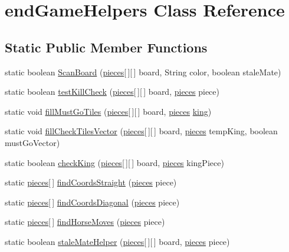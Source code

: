 \hypertarget{classendGameHelpers}{\section{end\-Game\-Helpers Class Reference}
\label{classendGameHelpers}
}
\subsection*{Static Public Member Functions}
\begin{DoxyCompactItemize}
\item 
static boolean \hyperlink{classendGameHelpers_af70c6992d6a206eb89390d43bb94127e}{Scan\-Board} (\hyperlink{classpieces}{pieces}\mbox{[}$\,$\mbox{]}\mbox{[}$\,$\mbox{]} board, String color, boolean stale\-Mate)
\item 
static boolean \hyperlink{classendGameHelpers_ad647747d8db844a580cf5d390cf5c257}{test\-Kill\-Check} (\hyperlink{classpieces}{pieces}\mbox{[}$\,$\mbox{]}\mbox{[}$\,$\mbox{]} board, \hyperlink{classpieces}{pieces} piece)
\item 
static void \hyperlink{classendGameHelpers_a951520156dbcb7cb09bbe3fdc6608e37}{fill\-Must\-Go\-Tiles} (\hyperlink{classpieces}{pieces}\mbox{[}$\,$\mbox{]}\mbox{[}$\,$\mbox{]} board, \hyperlink{classpieces}{pieces} \hyperlink{classking}{king})
\item 
static void \hyperlink{classendGameHelpers_a4b48a54058aa6d4d7bec6bdaa193ef42}{fill\-Check\-Tiles\-Vector} (\hyperlink{classpieces}{pieces}\mbox{[}$\,$\mbox{]}\mbox{[}$\,$\mbox{]} board, \hyperlink{classpieces}{pieces} temp\-King, boolean must\-Go\-Vector)
\item 
static boolean \hyperlink{classendGameHelpers_adbc97e6ce7eb3a4a404a211d21e8f2d8}{check\-King} (\hyperlink{classpieces}{pieces}\mbox{[}$\,$\mbox{]}\mbox{[}$\,$\mbox{]} board, \hyperlink{classpieces}{pieces} king\-Piece)
\item 
static \hyperlink{classpieces}{pieces}\mbox{[}$\,$\mbox{]} \hyperlink{classendGameHelpers_a8aa76533cb6df3b090e0725f2b6df635}{find\-Coords\-Straight} (\hyperlink{classpieces}{pieces} piece)
\item 
static \hyperlink{classpieces}{pieces}\mbox{[}$\,$\mbox{]} \hyperlink{classendGameHelpers_affa91018c7b90d5e60b9664372bbe4f1}{find\-Coords\-Diagonal} (\hyperlink{classpieces}{pieces} piece)
\item 
static \hyperlink{classpieces}{pieces}\mbox{[}$\,$\mbox{]} \hyperlink{classendGameHelpers_a84ae781b283ad06b42333db547f8f5e1}{find\-Horse\-Moves} (\hyperlink{classpieces}{pieces} piece)
\item 
static boolean \hyperlink{classendGameHelpers_ad8baa6af7c5b4fb227b0ed5a9477b8a2}{stale\-Mate\-Helper} (\hyperlink{classpieces}{pieces}\mbox{[}$\,$\mbox{]}\mbox{[}$\,$\mbox{]} board, \hyperlink{classpieces}{pieces} piece)
\end{DoxyCompactItemize}


